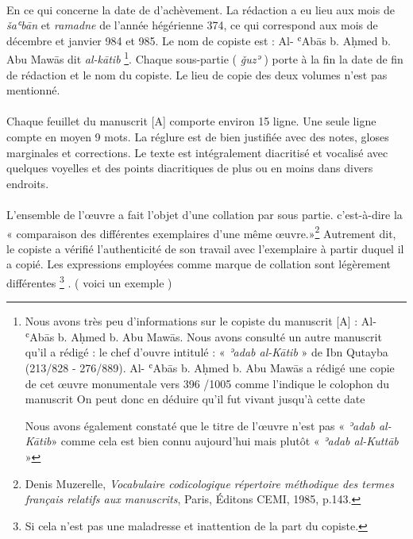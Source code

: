 \documentclass[a4paper,12pt]{report}
\begin{document}
\begin{itemize}
\begin{enumerate}
\paragraph{}
En ce qui concerne  la date de d’achèvement. La rédaction a eu lieu aux mois de \textit{šaʿbān} et\textit{ ramadne} de l'année hégérienne 374, ce qui correspond aux mois de décembre et janvier 984 et 985.
Le nom de copiste est : Al- ʿAbās b. Aḥmed b. Abu Mawās dit \textit{al-k\=atib}  \footnote { Nous avons très peu d’informations sur le copiste du  manuscrit [A] : Al- ʿAbās b. Aḥmed b. Abu Mawās. 
Nous avons consulté un autre manuscrit qu’il a rédigé : le chef d’ouvre  intitulé : « \textit{ʾadab al-Kātib} » de Ibn Qutayba  (213/828 - 276/889).  Al- ʿAbās b. Aḥmed b. Abu Mawās   a rédigé une copie de cet œuvre monumentale vers 396 /1005 comme l’indique le colophon du manuscrit 
On peut donc en déduire qu'il fut vivant jusqu'à cette date

Nous avons également  constaté  que le titre de l’œuvre n’est pas « \textit{ʾadab al-Kātib}» comme cela est bien connu aujourd’hui  mais plutôt « \textit{ʾadab  al-Kuttāb} »}. Chaque sous-partie ( \textit{ǧuzʾ} ) porte à la fin la date de fin de rédaction et le nom du copiste. Le lieu de copie des deux volumes n’est pas mentionné. 

\paragraph{}
Chaque feuillet du manuscrit [A] comporte  environ 15  ligne. Une seule ligne compte en moyen 9  mots. La réglure est de bien justifiée  avec  des notes, gloses marginales et corrections.  Le texte est intégralement diacritisé et vocalisé avec quelques voyelles et des points diacritiques de plus ou en moins dans divers endroits. 

\paragraph{}
L’ensemble de l’œuvre a fait l’objet d’une collation par sous partie.  c’est-à-dire la  « comparaison des différentes exemplaires d’une même œuvre.»\footnote{ Denis Muzerelle, \textit{Vocabulaire codicologique répertoire méthodique des termes français relatifs aux manuscrits}, Paris, Éditons CEMI, 1985,  p.143.  }  Autrement dit, le copiste a vérifié l’authenticité de son travail avec  l’exemplaire  à partir duquel il a copié. Les expressions employées comme marque  de collation sont légèrement différentes \footnote {Si cela n'est pas une maladresse et inattention de la part du copiste.} . ( voici un exemple )


\end{enumerate}
\end{itemize}
\end{document}
